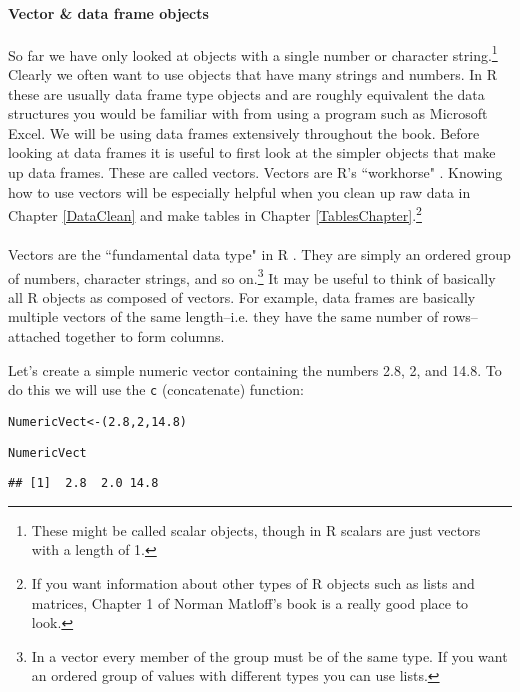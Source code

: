 \paragraph{Vector \& data frame objects}

So far we have only looked at objects with a single number or character string.\footnote{These might be called scalar objects, though in R scalars are just vectors with a length of 1.} Clearly we often want to use objects that have many strings and numbers. In R these are usually data frame type objects and are roughly equivalent the data structures you would be familiar with from using a program such as Microsoft Excel. We will be using data frames extensively throughout the book. Before looking at data frames it is useful to first look at the simpler objects that make up data frames. These are called vectors. Vectors are R's ``workhorse" \cite[]{Matloff2011}. Knowing how to use vectors will be especially helpful when you clean up raw data in Chapter \ref{DataClean} and make tables in Chapter \ref{TablesChapter}.\footnote{If you want information about other types of R objects such as lists and matrices, Chapter 1 of Norman Matloff's \citeyearpar{Matloff2011} book is a really good place to look.} \\[0.25cm]

 \\[0.25cm] Vectors are the ``fundamental data type" in R \cite[]{Matloff2011}. They are simply an ordered group of numbers, character strings, and so on.\footnote{In a vector every member of the group must be of the same type. If you want an ordered group of values with different types you can use lists.} It may be useful to think of basically all R objects as composed of vectors. For example, data frames are basically multiple vectors of the same length--i.e. they have the same number of rows--attached together to form columns. 

Let's create a simple numeric vector containing the numbers 2.8, 2, and 14.8. To do this we will use the \texttt{c} (concatenate) function:

\begin{knitrout}
\color{fgcolor}\begin{kframe}
\begin{alltt}
NumericVect <- (2.8, 2, 14.8)

NumericVect
\end{alltt}
\begin{verbatim}
## [1]  2.8  2.0 14.8
\end{verbatim}
\end{kframe}
\end{knitrout}


